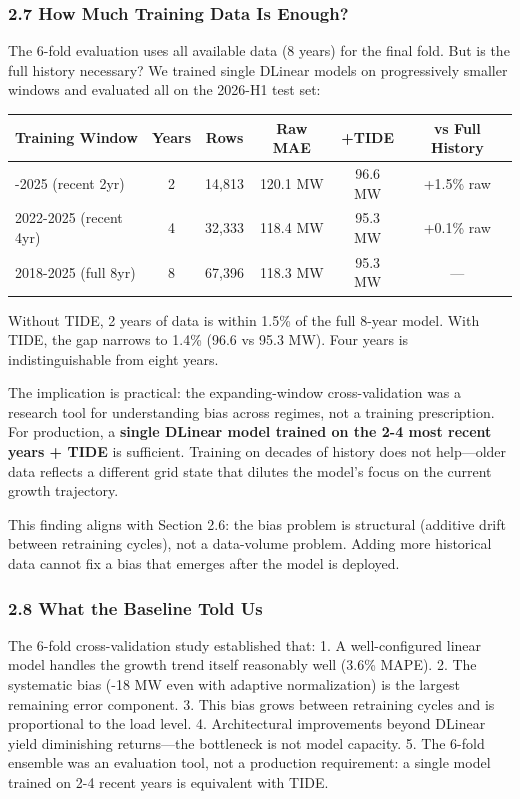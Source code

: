 \subsubsection{2.7 How Much Training Data Is
Enough?}\label{how-much-training-data-is-enough}

The 6-fold evaluation uses all available data (8 years) for the final
fold. But is the full history necessary? We trained single DLinear
models on progressively smaller windows and evaluated all on the 2026-H1
test set:

{\def\LTcaptype{none} %
\begin{longtable}[]{@{}lccccc@{}}
\toprule\noalign{}
Training Window & Years & Rows & Raw MAE & +TIDE & vs Full History \\
\midrule\noalign{}
\endhead
\bottomrule\noalign{}
\endlastfoot
2024-2025 (recent 2yr) & 2 & 14,813 & 120.1 MW & 96.6 MW & +1.5\% raw \\
2022-2025 (recent 4yr) & 4 & 32,333 & 118.4 MW & 95.3 MW & +0.1\% raw \\
2018-2025 (full 8yr) & 8 & 67,396 & 118.3 MW & 95.3 MW & --- \\
\end{longtable}
}

Without TIDE, 2 years of data is within 1.5\% of the full 8-year model.
With TIDE, the gap narrows to 1.4\% (96.6 vs 95.3 MW). Four years is
indistinguishable from eight years.

The implication is practical: the expanding-window cross-validation was
a research tool for understanding bias across regimes, not a training
prescription. For production, a \textbf{single DLinear model trained on
the 2-4 most recent years + TIDE} is sufficient. Training on decades of
history does not help---older data reflects a different grid state that
dilutes the model's focus on the current growth trajectory.

This finding aligns with Section 2.6: the bias problem is structural
(additive drift between retraining cycles), not a data-volume problem.
Adding more historical data cannot fix a bias that emerges after the
model is deployed.

\subsubsection{2.8 What the Baseline Told
Us}\label{what-the-baseline-told-us}

The 6-fold cross-validation study established that: 1. A well-configured
linear model handles the growth trend itself reasonably well (3.6\%
MAPE). 2. The systematic bias (-18 MW even with adaptive normalization)
is the largest remaining error component. 3. This bias grows between
retraining cycles and is proportional to the load level. 4.
Architectural improvements beyond DLinear yield diminishing
returns---the bottleneck is not model capacity. 5. The 6-fold ensemble
was an evaluation tool, not a production requirement: a single model
trained on 2-4 recent years is equivalent with TIDE.

